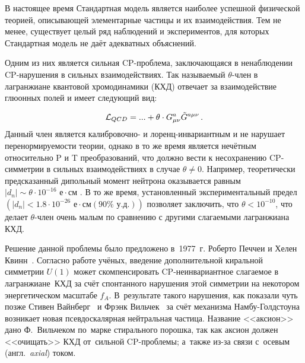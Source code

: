 \documentclass[a4paper,article,14pt]{extarticle}
\begin{document}

\tableofcontents
\pagebreak

\newcommand{\Tm}{$^{169}$Tm}
\newcommand{\Fe}{$^{57}$Fe}
\newcommand{\Kr}{$^{83}$Kr}
\newcommand{\TmAlO}{{Tm$3$}{Al$5$}{O$12$}}
\newcommand{\NaTmWO}{NaTm(WO$_4$)$_2$}
\newcommand{\NaTmMoO}{NaTm(MoO$_4$)$_2$}

\sloppy



В настоящее время Стандартная модель является наиболее успешной физической теорией, описывающей элементарные частицы и их взаимодействия. Тем не менее, существует целый ряд наблюдений и экспериментов, для которых Стандартная модель не даёт адекватных объяснений. 

Одним из них является сильная CP-проблема, заключающаяся в ненаблюдении CP-нарушения в сильных взаимодействиях. Так называемый $\theta$-член в лагранжиане квантовой хромодинамики (КХД) отвечает за взаимодействие глюонных полей и имеет следующий вид:

\begin{equation}\label{eq:lagrangian}
 {\cal L}_{QCD} =
     ... + \theta  \cdot G_{\mu \nu }^a {\tilde G^{a \mu \nu }}\, .
\end{equation}
Данный член является калибровочно- и лоренц-инвариантным и не нарушает перенормируемости теории, однако в то же время является нечётным относительно P и T преобразований, что должно вести к несохранению CP-симметрии в сильных взаимодействиях в случае $\theta \neq 0$. 
Например, теоретически предсказанный дипольный момент нейтрона оказывается равным $\left|{d_n} \right| \sim \theta  \cdot {10^{ - 16}} \text{ е} \cdot \text{см} $ \cite{NDMtheory}.
В то же время, установленный экспериментальный предел $ \left( \left| {{d_n}} \right| < 1.8 \cdot {10^{ - 26}} \text{ е} \cdot \text{см}\left( {90\% \text{ у.д.}} \right) \right)$ \cite{NDMexperiment} позволяет заключить, что $\theta < 10^{-10}$, что делает $\theta$-член очень малым по сравнению с другими слагаемыми лагранжиана КХД.

Решение данной проблемы было предложено в~1977~г. Роберто Печчеи и Хелен Квинн~\cite{PQ}.
Согласно работе учёных, введение дополнительной киральной симметрии $U{\left( 1 \right)}$ может скомпенсировать CP-неинвариантное слагаемое в лагранжиане~КХД за счёт спонтанного нарушения этой симметрии на некотором энергетическом масштабе $f_A$.
В~результате такого нарушения, как показали чуть позже Стивен Вайнберг~\cite{Weinberg} и Фрэнк Вильчек~\cite{Wilczek} за счёт механизма Намбу-Голдстоуна возникает новая псевдоскалярная нейтральная частица.
Название <<аксион>> дано Ф.~Вильчеком по~марке стирального порошка, так как аксион должен <<очищать>> КХД от~сильной CP-проблемы; а~также из-за связи с~осевым (англ.~\textit{axial}) током. 
\end{document}
